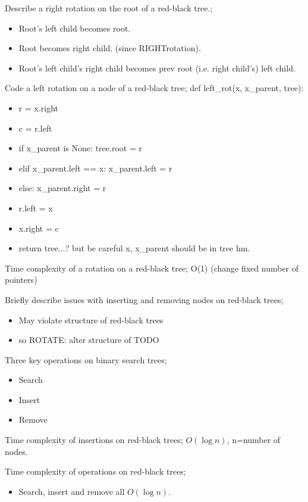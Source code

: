 \documentclass{article}
\begin{document}
Describe a right rotation on the root of a red-black tree.; \begin{itemize} \item Root's left child becomes root.  \item Root becomes right child. (since RIGHTrotation).  \item Root's left child's right child becomes prev root (i.e. right child's) left child.  \end{itemize}

Code a left rotation on a node of a red-black tree; def left\_rot(x, x\_parent, tree):\begin{itemize} \item r = x.right \item c = r.left \item if x\_parent is None: tree.root = r \item elif x\_parent.left == x: x\_parent.left = r \item else: x\_parent.right = r \item r.left = x \item x.right = c \item return tree...? but be careful x, x\_parent should be in tree hm.  \end{itemize}

Time complexity of a rotation on a red-black tree; O(1) (change fixed number of pointers)

Briefly describe issues with inserting and removing nodes on red-black trees; \begin{itemize} \item May violate structure of red-black trees \item so ROTATE: alter structure of TODO\end{itemize}

Three key operations on binary search trees; \begin{itemize} \item Search \item Insert \item Remove \end{itemize}

Time complexity of insertions on red-black trees; $O(\log n)$, n=number of nodes.

Time complexity of operations on red-black trees; \begin{itemize} \item Search, insert and remove all $O(\log n)$.  \end{itemize}
\end{document}
